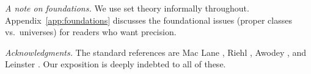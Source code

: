 \documentclass{amsbook}
\begin{document}
\bigskip
\noindent\textit{A note on foundations.} We use set theory informally throughout. Appendix~\ref{app:foundations} discusses the foundational issues (proper classes vs.\ universes) for readers who want precision.

\bigskip
\noindent\textit{Acknowledgments.} The standard references are Mac Lane \cite{MacLane1998}, Riehl \cite{Riehl2016}, Awodey \cite{Awodey2010}, and Leinster \cite{Leinster2014}. Our exposition is deeply indebted to all of these.

\tableofcontents

\mainmatter












\appendix




\backmatter

\printbibliography[heading=bibintoc, title={Bibliography}]

\end{document}

